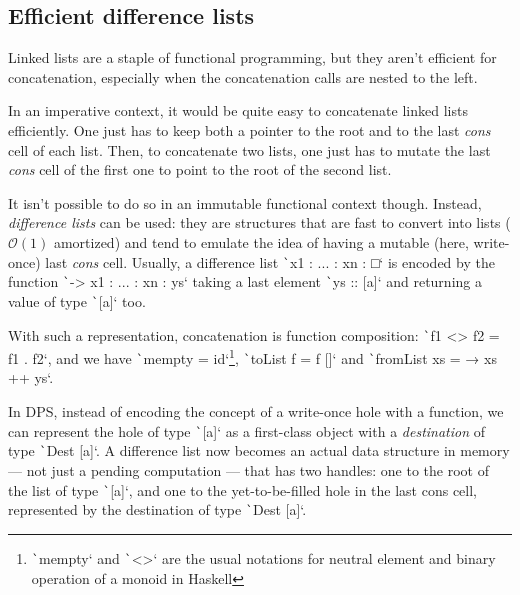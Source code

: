 \documentclass[english]{jflart}
\begin{document}
\subsection{Efficient difference lists}\label{ssec:dlist}

Linked lists are a staple of functional programming, but they aren't efficient for concatenation, especially when the concatenation calls are nested to the left.

In an imperative context, it would be quite easy to concatenate linked lists efficiently. One just has to keep both a pointer to the root and to the last \emph{cons} cell of each list. Then, to concatenate two lists, one just has to mutate the last \emph{cons} cell of the first one to point to the root of the second list.

It isn't possible to do so in an immutable functional context though. Instead, \emph{difference lists} can be used: they are structures that are fast to convert into lists ($\mathcal{O}(1)$ amortized) and tend to emulate the idea of having a mutable (here, write-once) last \emph{cons} cell. Usually, a difference list \texttt`x1 : ... : xn : □` is encoded by the function \texttt`\ys -> x1 : ... : xn : ys` taking a last element \texttt`ys :: [a]` and returning a value of type \texttt`[a]` too.

With such a representation, concatenation is function composition: \texttt`f1 <> f2 = f1 . f2`, and we have \texttt`mempty = id`\footnote{\texttt`mempty` and \texttt`<>` are the usual notations for neutral element and binary operation of a monoid in Haskell}, \texttt`toList f = f []` and \texttt`fromList xs = \ys → xs ++ ys`.

In DPS, instead of encoding the concept of a write-once hole with a function, we can represent the hole of type \texttt`[a]` as a first-class object with a \emph{destination} of type \texttt`Dest [a]`. A difference list now becomes an actual data structure in memory --- not just a pending computation --- that has two handles: one to the root of the list of type \texttt`[a]`, and one to the yet-to-be-filled hole in the last cons cell, represented by the destination of type \texttt`Dest [a]`.
\end{document}
